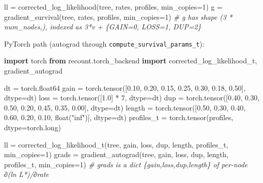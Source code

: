 \documentclass[
  10pt,
]{article}
\newenvironment{Shaded}{}{}
\newcommand{\BuiltInTok}[1]{\textcolor[rgb]{0.00,0.50,0.00}{#1}}
\newcommand{\CommentTok}[1]{\textcolor[rgb]{0.38,0.63,0.69}{\textit{#1}}}
\newcommand{\DecValTok}[1]{\textcolor[rgb]{0.25,0.63,0.44}{#1}}
\newcommand{\FloatTok}[1]{\textcolor[rgb]{0.25,0.63,0.44}{#1}}
\newcommand{\ImportTok}[1]{\textcolor[rgb]{0.00,0.50,0.00}{\textbf{#1}}}
\newcommand{\NormalTok}[1]{#1}
\newcommand{\OperatorTok}[1]{\textcolor[rgb]{0.40,0.40,0.40}{#1}}
\newcommand{\StringTok}[1]{\textcolor[rgb]{0.25,0.44,0.63}{#1}}
\begin{document}
\begin{Shaded}
\begin{Highlighting}[]
\NormalTok{ll }\OperatorTok{=}\NormalTok{ corrected\_log\_likelihood(tree, rates, profiles, min\_copies}\OperatorTok{=}\DecValTok{1}\NormalTok{)}
\NormalTok{g  }\OperatorTok{=}\NormalTok{ gradient\_survival(tree, rates, profiles, min\_copies}\OperatorTok{=}\DecValTok{1}\NormalTok{)}
\CommentTok{\# g has shape (3 * num\_nodes,), indexed as 3*v + \{GAIN=0, LOSS=1, DUP=2\}}
\end{Highlighting}
\end{Shaded}

PyTorch path (autograd through \texttt{compute\_survival\_params\_t}):

\begin{Shaded}
\begin{Highlighting}[]
\ImportTok{import}\NormalTok{ torch}
\ImportTok{from}\NormalTok{ recount.torch\_backend }\ImportTok{import}\NormalTok{ corrected\_log\_likelihood\_t, gradient\_autograd}

\NormalTok{dt }\OperatorTok{=}\NormalTok{ torch.float64}
\NormalTok{gain   }\OperatorTok{=}\NormalTok{ torch.tensor([}\FloatTok{0.10}\NormalTok{, }\FloatTok{0.20}\NormalTok{, }\FloatTok{0.15}\NormalTok{, }\FloatTok{0.25}\NormalTok{, }\FloatTok{0.30}\NormalTok{, }\FloatTok{0.18}\NormalTok{, }\FloatTok{0.50}\NormalTok{], dtype}\OperatorTok{=}\NormalTok{dt)}
\NormalTok{loss   }\OperatorTok{=}\NormalTok{ torch.tensor([}\FloatTok{1.0}\NormalTok{]  }\OperatorTok{*} \DecValTok{7}\NormalTok{, dtype}\OperatorTok{=}\NormalTok{dt)}
\NormalTok{dup    }\OperatorTok{=}\NormalTok{ torch.tensor([}\FloatTok{0.40}\NormalTok{, }\FloatTok{0.30}\NormalTok{, }\FloatTok{0.50}\NormalTok{, }\FloatTok{0.20}\NormalTok{, }\FloatTok{0.45}\NormalTok{, }\FloatTok{0.35}\NormalTok{, }\FloatTok{0.00}\NormalTok{], dtype}\OperatorTok{=}\NormalTok{dt)}
\NormalTok{length }\OperatorTok{=}\NormalTok{ torch.tensor([}\FloatTok{0.50}\NormalTok{, }\FloatTok{0.30}\NormalTok{, }\FloatTok{0.40}\NormalTok{, }\FloatTok{0.60}\NormalTok{, }\FloatTok{0.20}\NormalTok{, }\FloatTok{0.10}\NormalTok{, }\BuiltInTok{float}\NormalTok{(}\StringTok{"inf"}\NormalTok{)], dtype}\OperatorTok{=}\NormalTok{dt)}
\NormalTok{profiles\_t }\OperatorTok{=}\NormalTok{ torch.tensor(profiles, dtype}\OperatorTok{=}\NormalTok{torch.}\BuiltInTok{long}\NormalTok{)}

\NormalTok{ll    }\OperatorTok{=}\NormalTok{ corrected\_log\_likelihood\_t(tree, gain, loss, dup, length,}
\NormalTok{                                   profiles\_t, min\_copies}\OperatorTok{=}\DecValTok{1}\NormalTok{)}
\NormalTok{grads }\OperatorTok{=}\NormalTok{ gradient\_autograd(tree, gain, loss, dup, length,}
\NormalTok{                          profiles\_t, min\_copies}\OperatorTok{=}\DecValTok{1}\NormalTok{)}
\CommentTok{\# grads is a dict \{\textquotesingle{}gain\textquotesingle{},\textquotesingle{}loss\textquotesingle{},\textquotesingle{}dup\textquotesingle{},\textquotesingle{}length\textquotesingle{}\} of per{-}node ∂(ln L*)/∂rate}
\end{Highlighting}
\end{Shaded}
\end{document}
